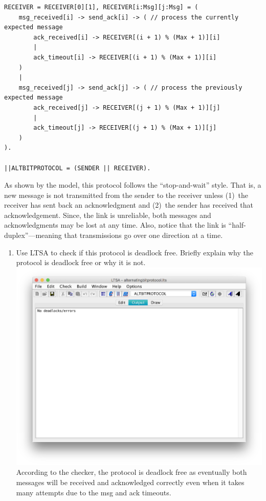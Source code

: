 \documentclass{article}
\begin{document}
\begin{enumerate}
\begin{small}
\begin{verbatim}
RECEIVER = RECEIVER[0][1], RECEIVER[i:Msg][j:Msg] = (
    msg_received[i] -> send_ack[i] -> ( // process the currently expected message
        ack_received[i] -> RECEIVER[(i + 1) % (Max + 1)][i]
        |
        ack_timeout[i] -> RECEIVER[(i + 1) % (Max + 1)][i]
    )
    |
    msg_received[j] -> send_ack[j] -> ( // process the previously expected message
        ack_received[j] -> RECEIVER[(j + 1) % (Max + 1)][j]
        |
        ack_timeout[j] -> RECEIVER[(j + 1) % (Max + 1)][j]
    )
).

||ALTBITPROTOCOL = (SENDER || RECEIVER).
\end{verbatim}
\end{small}

As shown by the model, this protocol follows the ``stop-and-wait''
style. That is, a new message is not transmitted from the sender to
the receiver unless (1)~the receiver has sent back an acknowledgment
and (2)~the sender has received that acknowledgement. Since, the
link is unreliable, both messages and acknowledgments may be lost at
any time. Also, notice that the link is ``half-duplex''---meaning
that transmissions go over one direction at a time.

\begin{enumerate}
\item Use LTSA to check if this protocol is deadlock free. Briefly explain why the protocol is deadlock free or why it is not. \\
\includegraphics[scale=0.5]{deadlocks.png}
According to the checker, the protocol is deadlock free as eventually both messages will be received and acknowledged correctly even when it takes many attempts due to the msg and ack timeouts.


\end{enumerate}
\end{enumerate}
\end{document}
